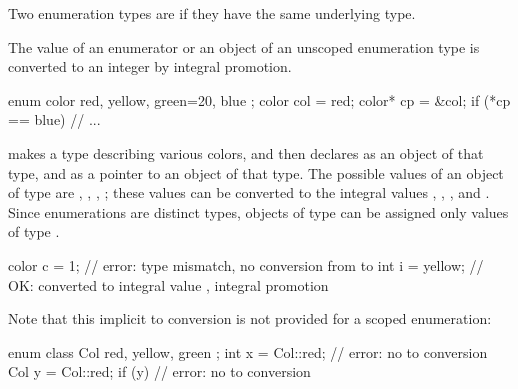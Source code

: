 \pnum
Two enumeration types are 
if they have the same underlying type.

\pnum
The value of an enumerator or an object of an unscoped enumeration type is
converted to an integer by integral promotion.
\begin{example}
\begin{codeblock}
  enum color { red, yellow, green=20, blue };
  color col = red;
  color* cp = &col;
  if (*cp == blue)              // ...
\end{codeblock}
makes  a type describing various colors, and then declares
 as an object of that type, and  as a pointer to an
object of that type. The possible values of an object of type
 are , , ,
; these values can be converted to the integral values
, , , and . Since enumerations are
distinct types, objects of type  can be assigned only
values of type .
\begin{codeblock}
color c = 1;                    // error: type mismatch, no conversion from  to 
int i = yellow;                 // OK:  converted to integral value , integral promotion
\end{codeblock}
Note that this implicit  to 
conversion is not provided for a scoped enumeration:
\begin{codeblock}
enum class Col { red, yellow, green };
int x = Col::red;               // error: no  to  conversion
Col y = Col::red;
if (y) { }                      // error: no  to  conversion
\end{codeblock}
\end{example}

